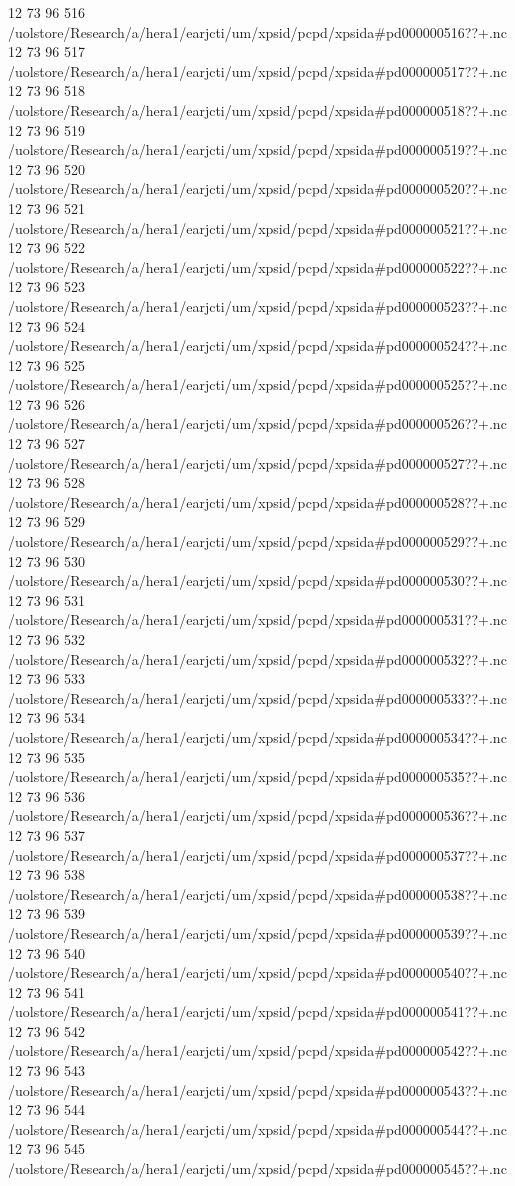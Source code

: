 12 73 96
516
/uolstore/Research/a/hera1/earjcti/um/xpsid/pcpd/xpsida#pd000000516??+.nc
12 73 96
517
/uolstore/Research/a/hera1/earjcti/um/xpsid/pcpd/xpsida#pd000000517??+.nc
12 73 96
518
/uolstore/Research/a/hera1/earjcti/um/xpsid/pcpd/xpsida#pd000000518??+.nc
12 73 96
519
/uolstore/Research/a/hera1/earjcti/um/xpsid/pcpd/xpsida#pd000000519??+.nc
12 73 96
520
/uolstore/Research/a/hera1/earjcti/um/xpsid/pcpd/xpsida#pd000000520??+.nc
12 73 96
521
/uolstore/Research/a/hera1/earjcti/um/xpsid/pcpd/xpsida#pd000000521??+.nc
12 73 96
522
/uolstore/Research/a/hera1/earjcti/um/xpsid/pcpd/xpsida#pd000000522??+.nc
12 73 96
523
/uolstore/Research/a/hera1/earjcti/um/xpsid/pcpd/xpsida#pd000000523??+.nc
12 73 96
524
/uolstore/Research/a/hera1/earjcti/um/xpsid/pcpd/xpsida#pd000000524??+.nc
12 73 96
525
/uolstore/Research/a/hera1/earjcti/um/xpsid/pcpd/xpsida#pd000000525??+.nc
12 73 96
526
/uolstore/Research/a/hera1/earjcti/um/xpsid/pcpd/xpsida#pd000000526??+.nc
12 73 96
527
/uolstore/Research/a/hera1/earjcti/um/xpsid/pcpd/xpsida#pd000000527??+.nc
12 73 96
528
/uolstore/Research/a/hera1/earjcti/um/xpsid/pcpd/xpsida#pd000000528??+.nc
12 73 96
529
/uolstore/Research/a/hera1/earjcti/um/xpsid/pcpd/xpsida#pd000000529??+.nc
12 73 96
530
/uolstore/Research/a/hera1/earjcti/um/xpsid/pcpd/xpsida#pd000000530??+.nc
12 73 96
531
/uolstore/Research/a/hera1/earjcti/um/xpsid/pcpd/xpsida#pd000000531??+.nc
12 73 96
532
/uolstore/Research/a/hera1/earjcti/um/xpsid/pcpd/xpsida#pd000000532??+.nc
12 73 96
533
/uolstore/Research/a/hera1/earjcti/um/xpsid/pcpd/xpsida#pd000000533??+.nc
12 73 96
534
/uolstore/Research/a/hera1/earjcti/um/xpsid/pcpd/xpsida#pd000000534??+.nc
12 73 96
535
/uolstore/Research/a/hera1/earjcti/um/xpsid/pcpd/xpsida#pd000000535??+.nc
12 73 96
536
/uolstore/Research/a/hera1/earjcti/um/xpsid/pcpd/xpsida#pd000000536??+.nc
12 73 96
537
/uolstore/Research/a/hera1/earjcti/um/xpsid/pcpd/xpsida#pd000000537??+.nc
12 73 96
538
/uolstore/Research/a/hera1/earjcti/um/xpsid/pcpd/xpsida#pd000000538??+.nc
12 73 96
539
/uolstore/Research/a/hera1/earjcti/um/xpsid/pcpd/xpsida#pd000000539??+.nc
12 73 96
540
/uolstore/Research/a/hera1/earjcti/um/xpsid/pcpd/xpsida#pd000000540??+.nc
12 73 96
541
/uolstore/Research/a/hera1/earjcti/um/xpsid/pcpd/xpsida#pd000000541??+.nc
12 73 96
542
/uolstore/Research/a/hera1/earjcti/um/xpsid/pcpd/xpsida#pd000000542??+.nc
12 73 96
543
/uolstore/Research/a/hera1/earjcti/um/xpsid/pcpd/xpsida#pd000000543??+.nc
12 73 96
544
/uolstore/Research/a/hera1/earjcti/um/xpsid/pcpd/xpsida#pd000000544??+.nc
12 73 96
545
/uolstore/Research/a/hera1/earjcti/um/xpsid/pcpd/xpsida#pd000000545??+.nc
